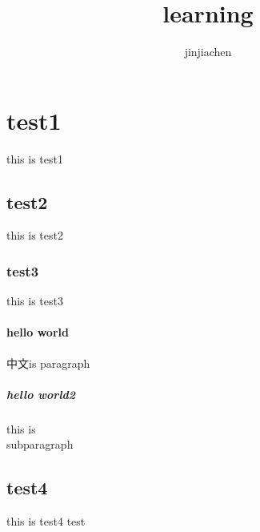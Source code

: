\documentclass{article}
\author{jinjiachen}
\title{learning}
\begin{document}
\maketitle
\tableofcontents
\section{test1} this is test1
\subsection{test2} this is test2
\subsubsection{test3} this is test3
\paragraph{hello world} 中文is paragraph

\subparagraph{hello world2} this is \\subparagraph
\subsection{test4} this is test4
test    %
\end{document}
